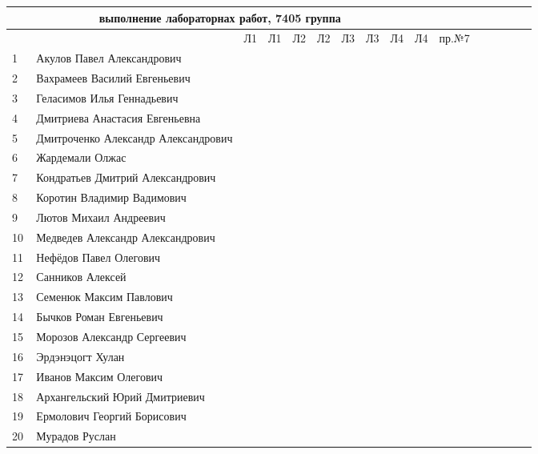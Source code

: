 \documentclass[a4paper,11pt]{article}
\begin{document}
\newpage
%
\begin{tabular}{l|llccccccccccccc}
\multicolumn{10}{c}{выполнение лабораторнах работ, 7405 группа} \\
\toprule
&&Л1&Л1& Л2&Л2& Л3&Л3& Л4&Л4&пр.№7\\
\midrule
1\,& Акулов Павел Александрович  &&&&&&&&\\
2\,& Вахрамеев Василий Евгеньевич   &&&&&&&&\\
3\,& Геласимов Илья Геннадьевич   &&&&&&&&\\
4\,& Дмитриева Анастасия Евгеньевна   &&&&&&&&\\
5\,& Дмитроченко Александр Александрович   &&&&&&&&\\
\midrule
6\,& Жардемали Олжас   &&&&&&&&\\
7\,& Кондратьев Дмитрий Александрович   &&&&&&&&\\
8\,& Коротин Владимир Вадимович   &&&&&&&&\\
9\,& Лютов Михаил Андреевич  &&&&&&&&\\
10\,&Медведев Александр Александрович  &&&&&&&&\\
\midrule
11\,&Нефёдов Павел Олегович  &&&&&&&&\\
12\,&Санников Алексей  &&&&&&&&\\
13\,&Семенюк Максим Павлович  &&&&&&&&\\
14\,&Бычков Роман Евгеньевич  &&&&&&&&\\
15\,&Морозов Александр Сергеевич  &&&&&&&&\\
\midrule
16\,&Эрдэнэцогт Хулан  &&&&&&&&\\
17\,&Иванов Максим Олегович  &&&&&&&&\\
18\,&Архангельский Юрий Дмитриевич &&&&&&&&\\ 
19\,&Ермолович Георгий Борисович &&&&&&&&\\
20\,& Мурадов Руслан &&&&&&&&\\
\bottomrule
\end{tabular}
\end{document}
